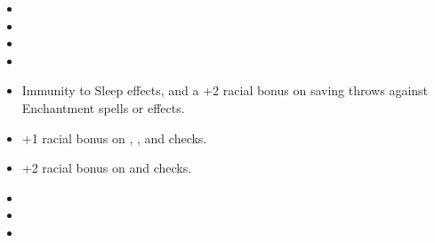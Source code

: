 
\begin{itemize}
\item {}
\item {}
\item {}
\item {}
\item Immunity to Sleep effects, and a +2 racial bonus on saving throws against Enchantment spells or effects.
\item +1 racial bonus on , , and  checks.
\item +2 racial bonus on  and  checks.
\item {}
\item {}
\item {}
\end{itemize}
